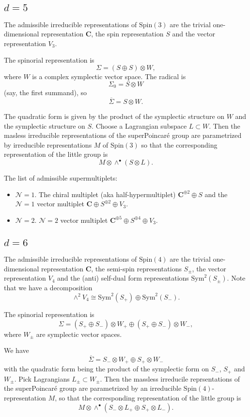 \documentclass[12pt]{amsart}
\newcommand{\C}{\mathbf{C}}
\newcommand{\cN}{\mathcal{N}}
\newcommand{\Spin}{\mathrm{Spin}}
\newcommand{\Sym}{\mathrm{Sym}}
\theoremstyle{definition}
\theoremstyle{remark}
\begin{document}
\subsection{$d=5$}

The admissible irreducible representations of $\Spin(3)$ are the trivial one-dimensional representation $\C$, the spin representation $S$ and the vector representation $V_3$.

The spinorial representation is
\[\Sigma = (S\oplus S)\otimes W,\]
where $W$ is a complex symplectic vector space. The radical is
\[\Sigma_0 = S\otimes W\]
(say, the first summand), so
\[\overline{\Sigma} = S\otimes W.\]

The quadratic form is given by the product of the symplectic structure on $W$ and the symplectic structure on $S$. Choose a Lagrangian subspace $L\subset W$. Then the masless irreducible representations of the superPoincar\'{e} group are parametrized by irreducible representations $M$ of $\Spin(3)$ so that the corresponding representation of the little group is
\[M\otimes \wedge^\bullet(S\otimes L).\]

The list of admissible supermultiplets:
\begin{itemize}
\item $\cN=1$. The chiral multiplet (aka half-hypermultiplet) $\C^{\oplus 2}\oplus S$ and the $\cN=1$ vector multiplet $\C\oplus S^{\oplus 2}\oplus V_3$.

\item $\cN=2$. $\cN=2$ vector multiplet $\C^{\oplus 5}\oplus S^{\oplus 4}\oplus V_3$.
\end{itemize}

\subsection{$d=6$}

The admissible irreducible representations of $\Spin(4)$ are the trivial one-dimensional representation $\C$, the semi-spin representations $S_{\pm}$, the vector representation $V_4$ and the (anti) self-dual form representations $\Sym^2(S_{\pm})$. Note that we have a decomposition
\[\wedge^2 V_4\cong \Sym^2(S_+)\oplus \Sym^2(S_-).\]

The spinorial representation is
\[\Sigma = (S_+\oplus S_-)\otimes W_+\oplus (S_+\oplus S_-)\otimes W_-,\]
where $W_\pm$ are symplectic vector spaces.

We have
\[\overline{\Sigma} = S_-\otimes W_+\oplus S_+\otimes W_-\]
with the quadratic form being the product of the symplectic form on $S_-$, $S_+$ and $W_{\pm}$. Pick Lagrangians $L_{\pm}\subset W_{\pm}$. Then the massless irreducile reprsentations of the superPoincar\'{e} group are parametrized by an irreducible $\Spin(4)$-representation $M$, so that the corresponding representation of the little group is
\[M\otimes \wedge^\bullet(S_-\otimes L_+\oplus S_+\otimes L_-).\]
\end{document}
